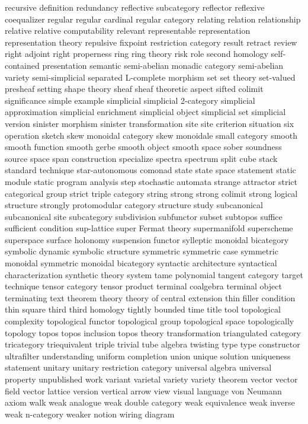 recursive definition
redundancy
reflective subcategory
reflector
reflexive coequalizer
regular
regular cardinal
regular category
relating
relation
relationship
relative
relative computability
relevant
representable
representation
representation theory
repulsive fixpoint
restriction category
result
retract
review
right adjoint
right properness
ring
ring theory
risk
role
second homology
self-contained presentation
semantic
semi-abelian monadic category
semi-abelian variety
semi-simplicial
separated L-complete morphism
set
set theory
set-valued presheaf
setting
shape theory
sheaf
sheaf theoretic aspect
sifted colimit
significance
simple example
simplicial
simplicial 2-category
simplicial approximation
simplicial enrichment
simplicial object
simplicial set
simplicial version
sinister morphism
sinister transformation
site
site criterion
situation
six operation
sketch
skew monoidal category
skew monoidale
small category
smooth
smooth function
smooth gerbe
smooth object
smooth space
sober
soundness
source
space
span construction
specialize
spectra
spectrum
split cube
stack
standard technique
star-autonomous comonad
state
state space
statement
static module
static program analysis
step
stochastic automata
strange attractor
strict categorical group
strict triple category
string
strong
strong colimit
strong logical structure
strongly protomodular category
structure
study
subcanonical
subcanonical site
subcategory
subdivision
subfunctor
subset
subtopos
suffice
sufficient condition
sup-lattice
super Fermat theory
supermanifold
superscheme
superspace
surface holonomy
suspension functor
sylleptic monoidal bicategory
symbolic dynamic
symbolic structure
symmetric
symmetric case
symmetric monoidal
symmetric monoidal bicategory
syntactic architecture
syntactical characterization
synthetic theory
system
tame polynomial
tangent category
target
technique
tensor category
tensor product
terminal coalgebra
terminal object
terminating
text
theorem
theory
theory of central extension
thin filler condition
thin square
third
third homology
tightly bounded
time
title
tool
topological complexity
topological functor
topological group
topological space
topologically
topology
topos
topos inclusion
topos theory
transformation
triangulated category
tricategory
triequivalent
triple
trivial
tube algebra
twisting
type
type constructor
ultrafilter
understanding
uniform completion
union
unique solution
uniqueness statement
unitary
unitary restriction category
universal algebra
universal property
unpublished work
variant
varietal
variety
variety theorem
vector
vector field
vector lattice
version
vertical arrow
view
visual language
von Neumann axiom
walk
weak analogue
weak double category
weak equivalence
weak inverse
weak n-category
weaker notion
wiring diagram